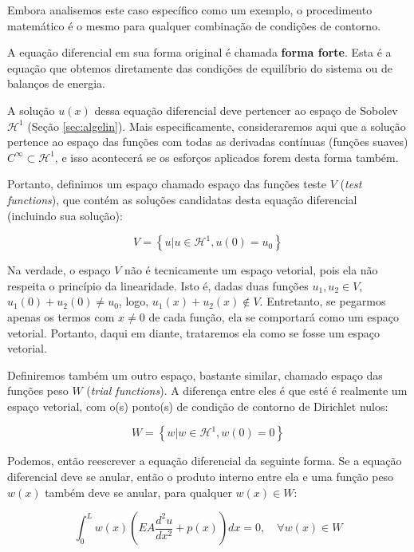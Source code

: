         Embora analisemos este caso específico como um exemplo, o procedimento matemático é o mesmo para qualquer combinação de condições de contorno.

        A equação diferencial em sua forma original é chamada \textbf{forma forte}. Esta é a equação que obtemos diretamente das condições de equilíbrio do sistema ou de balanços de energia.

        A solução $u(x)$ dessa equação diferencial deve pertencer ao espaço de Sobolev $\mathcal{H}^1$ (Seção \ref{sec:algelin}). Mais especificamente, consideraremos aqui que a solução pertence ao espaço das funções com todas as derivadas contínuas (funções suaves) $C^\infty \subset \mathcal{H}^1$, e isso acontecerá se os esforços aplicados forem desta forma também.

        Portanto, definimos um espaço chamado espaço das funções teste $V$ (\textit{test functions}), que contém as soluções candidatas desta equação diferencial (incluindo sua solução):

        \begin{equation}
            V = \left\{u| u \in \mathcal{H}^1, u(0)=u_0 \right\}
        \end{equation}

        Na verdade, o espaço $V$ não é tecnicamente um espaço vetorial, pois ela não respeita o princípio da linearidade. Isto é, dadas duas funções $u_1,u_2 \in V$, $u_1(0) + u_2(0) \neq u_0$, logo, $u_1(x) + u_2(x) \notin V$. Entretanto, se pegarmos apenas os termos com $x \neq 0$ de cada função, ela se comportará como um espaço vetorial. Portanto, daqui em diante, trataremos ela como se fosse um espaço vetorial.

        Definiremos também um outro espaço, bastante similar, chamado espaço das funções peso $W$ (\textit{trial functions}). A diferença entre eles é que esté é realmente um espaço vetorial, com o(s) ponto(s) de condição de contorno de Dirichlet nulos:

        \begin{equation}
            W = \left\{w| w \in \mathcal{H}^1, w(0)=0 \right\}
        \end{equation}

        Podemos, então reescrever a equação diferencial da seguinte forma. Se a equação diferencial deve se anular, então o produto interno entre ela e uma função peso $w(x)$ também deve se anular, para qualquer $w(x) \in W$:

        \begin{equation}
            \int_0^L w(x)\left(EA\frac{d^2u}{dx^2} + p(x)\right) dx= 0 , \quad \forall w(x) \in W
        \end{equation}

